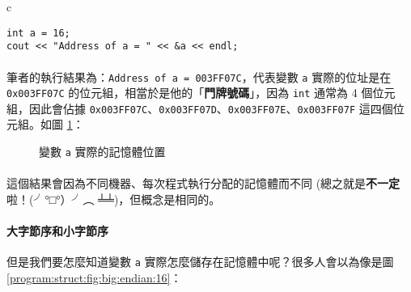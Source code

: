 \documentclass[12pt,a4paper,oneside]{article}
\begin{document}
\begin{CJK}{UTF8}{bkai}
\begin{code}[h!]
\centering
\begin{tabular}{c}
\begin{lstlisting}
int a = 16;
cout << "Address of a = " << &a << endl;
\end{lstlisting}
\end{tabular}
\caption{印出 \lstinline!a! 的位址}
\label{program:struct:code:address}
\end{code}

\paragraph{}筆者的執行結果為：\lstinline!Address of a = 003FF07C!，代表變數 \lstinline!a! 實際的位址是在 \lstinline!0x003FF07C! 的位元組，相當於是他的「\textbf{門牌號碼}」，因為 \lstinline!int! 通常為 4 個位元組，因此會佔據 \lstinline!0x003FF07C!、\lstinline!0x003FF07D!、\lstinline!0x003FF07E!、\lstinline!0x003FF07F! 這四個位元組。如圖 \ref{program:struct:fig:int:address}：

\begin{figure}[h!]
\centering
{}
\caption{變數 \lstinline!a! 實際的記憶體位置}
\label{program:struct:fig:int:address}
\end{figure}

\paragraph{}這個結果會因為不同機器、每次程式執行分配的記憶體而不同 (總之就是\textbf{不一定}啦！(╯°□°）╯︵ ╧╧)，但概念是相同的。

\paragraph{大字節序和小字節序}但是我們要怎麼知道變數 \lstinline!a! 實際怎麼儲存在記憶體中呢？很多人會以為像是圖 \ref{program:struct:fig:big:endian:16}：


\end{CJK}
\end{document}
